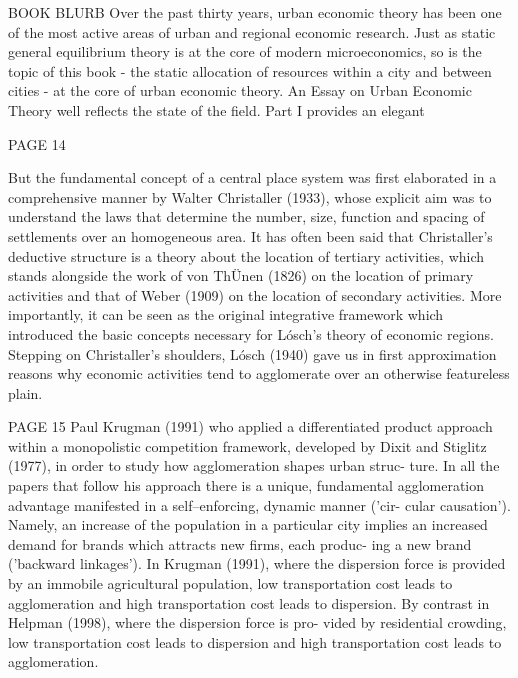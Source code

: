 BOOK BLURB
Over the past thirty years, urban economic theory has been one of the most active areas of urban and regional economic research. Just as static general equilibrium theory is at the core of modern microeconomics, so is the topic of this book - the static allocation of resources within a city and between cities - at the core of urban economic theory. An Essay on Urban Economic Theory well reflects the state of the field. Part I provides an elegant

PAGE 14

But the fundamental concept of a central place system was first elaborated in a comprehensive manner by Walter Christaller (1933), whose explicit aim was to understand the laws that determine the number, size, function and spacing of settlements over an homogeneous area. It has often been said that Christaller's deductive structure is a theory about the location of tertiary activities, which stands alongside the work of von Th\"Unen (1826) on the location of primary activities and that of Weber (1909) on the location of secondary activities. More importantly, it can be seen as the original integrative framework which introduced the basic concepts necessary for L\'osch's theory of economic regions. Stepping on Christaller's shoulders, L\'osch (1940) gave us in first approximation reasons why economic activities tend to agglomerate over an otherwise featureless plain. 

PAGE 15  Paul Krugman (1991) who applied a differentiated product approach within a monopolistic competition framework, developed by Dixit and Stiglitz (1977), in order to study how agglomeration shapes urban struc- ture. In all the papers that follow his approach there is a unique, fundamental agglomeration advantage manifested in a self--enforcing, dynamic manner ('cir- cular causation'). Namely, an increase of the population in a particular city implies an increased demand for brands which attracts new firms, each produc- ing a new brand ('backward linkages').
In Krugman (1991), where the dispersion force is provided by an immobile agricultural population, low transportation cost leads to agglomeration and high transportation cost leads to dispersion. By contrast in Helpman (1998), where the dispersion force is pro- vided by residential crowding, low transportation cost leads to dispersion and high transportation cost leads to agglomeration.

